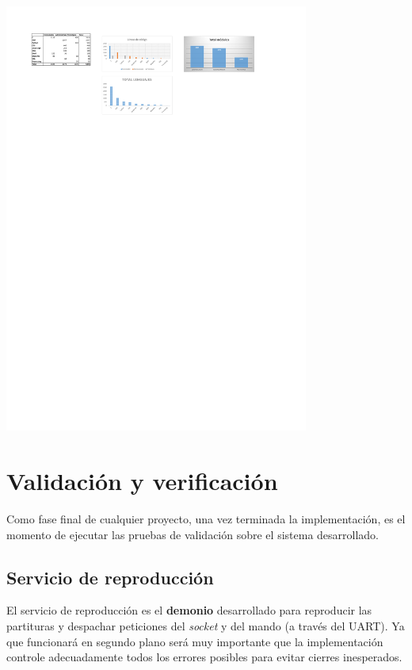 \documentclass[10pt,a4paper]{article}
\begin{document}
	\begin{center}
		\includegraphics[width=0.75\textwidth]{images/lineas_lenguajes} 
	\end{center}
	
	
	\section{Validación y verificación}
	
	Como fase final de cualquier proyecto, una vez terminada la implementación, es el momento de ejecutar las pruebas de validación sobre el sistema desarrollado.
	
	\subsection{Servicio de reproducción}
	
	El servicio de reproducción es el \textbf{demonio} desarrollado para reproducir las partituras y despachar peticiones del \textit{socket} y del mando (a través del UART). Ya que funcionará en segundo plano será muy importante que la implementación controle adecuadamente todos los errores posibles para evitar cierres inesperados.
	
\end{document}
